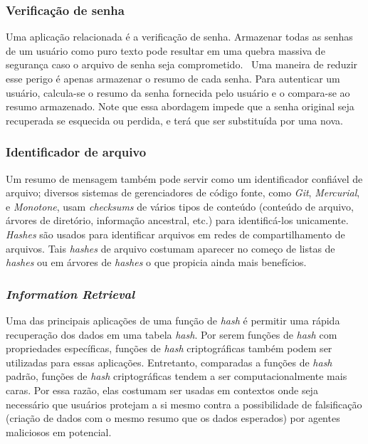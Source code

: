 \subsubsection{Verificação de senha}

Uma aplicação relacionada é a verificação de senha.
Armazenar todas as senhas de um usuário como puro texto pode resultar em uma quebra massiva de segurança caso o arquivo de senha seja comprometido.~\cite{wiki:hashapp2}
Uma maneira de reduzir esse perigo é apenas armazenar o resumo de cada senha.
Para autenticar um usuário, calcula-se o resumo da senha fornecida pelo usuário e o compara-se ao resumo armazenado.
Note que essa abordagem impede que a senha original seja recuperada se esquecida ou perdida, e terá que ser substituída por uma nova.

\subsubsection{Identificador de arquivo}

Um resumo de mensagem também pode servir como um identificador confiável de arquivo; diversos sistemas de gerenciadores de código fonte, como \textit{Git}, \textit{Mercurial}, e \textit{Monotone}, usam \textit{checksums} de vários tipos de conteúdo (conteúdo de arquivo, árvores de diretório, informação ancestral, etc.) para identificá-los unicamente.~\cite{wiki:hashapp3}
\textit{Hashes} são usados para identificar arquivos em redes de compartilhamento de arquivos.
Tais \textit{hashes} de arquivo costumam aparecer no começo de listas de \textit{hashes} ou em árvores de \textit{hashes} o que propicia ainda mais benefícios.

\subsubsection{\textit{Information Retrieval}}

Uma das principais aplicações de uma função de \textit{hash} é permitir uma rápida recuperação dos dados em uma tabela \textit{hash}.
Por serem funções de \textit{hash} com propriedades específicas, funções de \textit{hash} criptográficas também podem ser utilizadas para essas aplicações.
Entretanto, comparadas a funções de \textit{hash} padrão, funções de \textit{hash} criptográficas tendem a ser computacionalmente mais caras.
Por essa razão, elas costumam ser usadas em contextos onde seja necessário que usuários protejam a si mesmo contra a possibilidade de falsificação (criação de dados com o mesmo resumo que os dados esperados) por agentes maliciosos em potencial.

